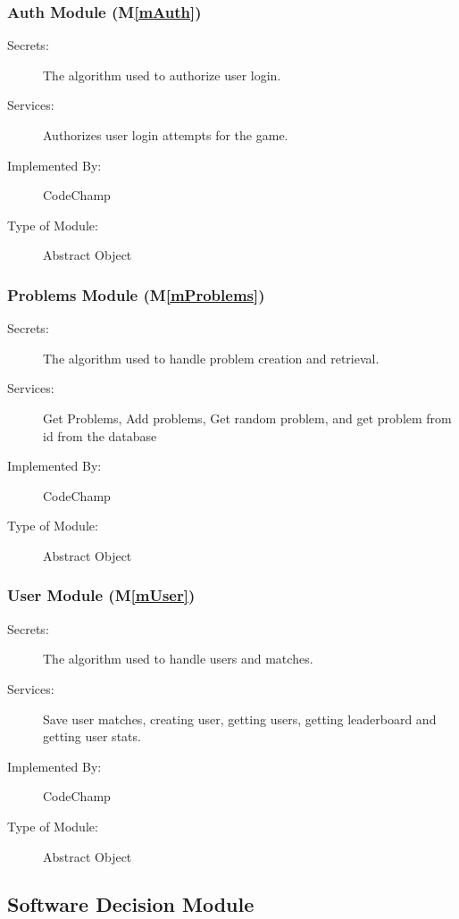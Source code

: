 \documentclass[12pt, titlepage]{article}
\newcommand{\mref}[1]{M\ref{#1}}
\begin{document}
\subsubsection{ Auth Module (\mref{mAuth})}

\begin{description}
\item[Secrets:] The algorithm used to authorize user login.
\item[Services:] Authorizes user login attempts for the game.
\item[Implemented By:] CodeChamp
\item[Type of Module:] Abstract Object
\end{description}

\subsubsection{ Problems Module (\mref{mProblems})}

\begin{description}
\item[Secrets:] The algorithm used to handle problem creation and retrieval.
\item[Services:] Get Problems, Add problems, Get random problem, and get problem from id from the database
\item[Implemented By:] CodeChamp
\item[Type of Module:] Abstract Object
\end{description}

\subsubsection{ User Module (\mref{mUser})}

\begin{description}
\item[Secrets:] The algorithm used to handle users and matches.
\item[Services:] Save user matches, creating user, getting users, getting leaderboard and getting user stats.
\item[Implemented By:] CodeChamp
\item[Type of Module:] Abstract Object
\end{description}

\subsection{Software Decision Module}
\end{document}
